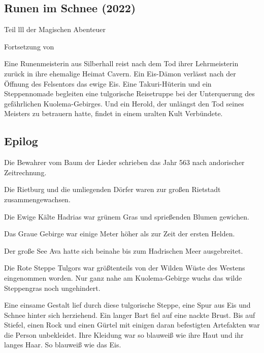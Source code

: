 
\begin{chapterbox}
    \chapter{Runen im Schnee (2022)}
    \label{Runen im Schnee (2022)}

    \begin{center}
        Teil lll der Magischen Abenteuer
        
        Fortsetzung von 
    \end{center}
    
    Eine Runenmeisterin aus Silberhall reist nach dem Tod ihrer Lehrmeisterin zurück in ihre ehemalige Heimat Cavern. Ein Eis-Dämon verlässt nach der Öffnung des Felsentors das ewige Eis. Eine Takuri-Hüterin und ein Steppennomade begleiten eine tulgorische Reisetruppe bei der Unterquerung des gefährlichen Kuolema-Gebirges. Und ein Herold, der unlängst den Tod seines Meisters zu betrauern hatte, findet in einem uralten Kult Verbündete.
\end{chapterbox}







\section{Epilog}


Die Bewahrer vom Baum der Lieder schrieben das Jahr 563 nach andorischer Zeitrechnung.

Die Rietburg und die umliegenden Dörfer waren zur großen Rietstadt zusammengewachsen.

Die Ewige Kälte Hadrias war grünem Gras und sprießenden Blumen gewichen.

Das Graue Gebirge war einige Meter höher als zur Zeit der ersten Helden.

Der große See Ava hatte sich beinahe bis zum Hadrischen Meer ausgebreitet.

Die Rote Steppe Tulgors war größtenteils von der Wilden Wüste des Westens eingenommen worden. Nur ganz nahe am Kuolema-Gebirge wuchs das wilde Steppengras noch ungehindert.

Eine einsame Gestalt lief durch diese tulgorische Steppe, eine Spur aus Eis und Schnee hinter sich herziehend. Ein langer Bart fiel auf eine nackte Brust. Bis auf Stiefel, einen Rock und einen Gürtel mit einigen daran befestigten Artefakten war die Person unbekleidet. Ihre Kleidung war so blauweiß wie ihre Haut und ihr langes Haar. So blauweiß wie das Eis.

